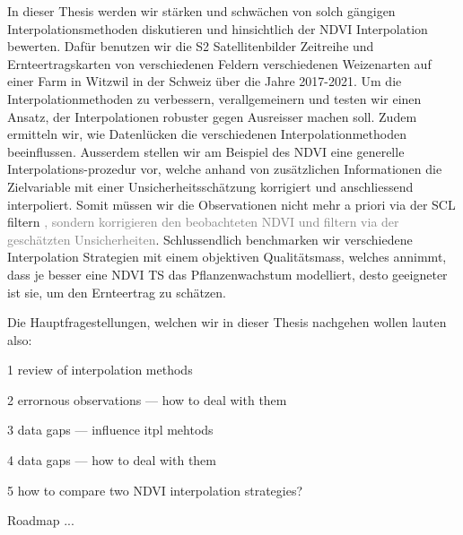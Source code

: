 In dieser Thesis werden wir stärken und schwächen von solch gängigen Interpolationsmethoden diskutieren und hinsichtlich der NDVI Interpolation bewerten. Dafür benutzen wir die S2 Satellitenbilder Zeitreihe und Ernteertragskarten von verschiedenen Feldern verschiedenen Weizenarten auf einer Farm in Witzwil in der Schweiz über die Jahre 2017-2021.
Um die Interpolationmethoden zu verbessern, verallgemeinern und testen wir einen Ansatz, der Interpolationen robuster gegen Ausreisser machen soll. Zudem ermitteln wir, wie Datenlücken die verschiedenen Interpolationmethoden beeinflussen. Ausserdem stellen wir am Beispiel des NDVI eine generelle Interpolations-prozedur vor, welche anhand von zusätzlichen Informationen die Zielvariable mit einer Unsicherheitsschätzung korrigiert und anschliessend interpoliert. Somit müssen wir die Observationen nicht mehr a priori via der SCL filtern \textcolor{gray}{, sondern korrigieren den beobachteten NDVI und filtern via der geschätzten Unsicherheiten}. Schlussendlich benchmarken wir verschiedene Interpolation Strategien mit einem objektiven Qualitätsmass, welches annimmt, dass je besser eine NDVI TS das Pflanzenwachstum modelliert, desto geeigneter ist sie, um den Ernteertrag zu schätzen. 

Die Hauptfragestellungen, welchen wir in dieser Thesis nachgehen wollen lauten also:
\begin{Nenumerate}
    \item 1 review of interpolation methods
    \item 2 errornous observations --- how to deal with them
    \item 3 data gaps --- influence itpl mehtods 
    \item 4 data gaps --- how to deal with them
    \item 5 how to compare two NDVI interpolation strategies?
\end{Nenumerate}

Roadmap ...









